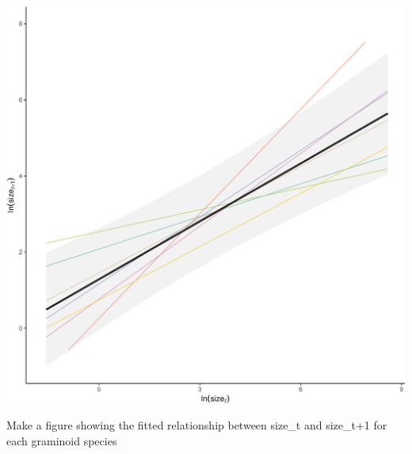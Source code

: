 \documentclass[
]{article}
\begin{document}
\includegraphics{figures/unnamed-chunk-10-1.pdf}

Make a figure showing the fitted relationship between size\_t and
size\_t+1 for each graminoid species
\end{document}
